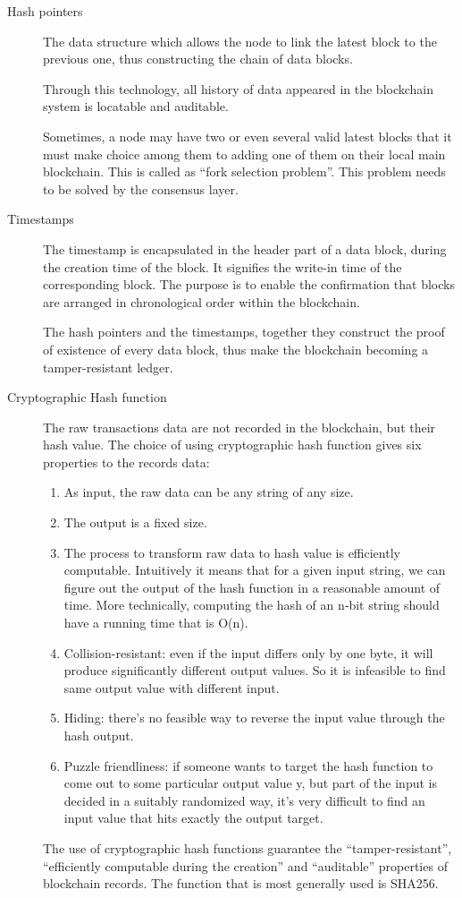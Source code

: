 \documentclass[doublespacing]{bmcart}
\begin{document}
\begin{CJK*}{UTF8}{gbsn}
\begin{description}
\item[Hash pointers] 
 
The data structure which allows the node to link the latest block to the previous one, thus constructing the chain of data blocks.
 
Through this technology, all history of data appeared in the blockchain system is locatable and auditable.
 
Sometimes, a node may have two or even several valid latest blocks that it must make choice among them to adding one of them on their local main blockchain. This is called as ``fork selection problem''. This problem needs to be solved by the consensus layer.

\item[Timestamps] 

The timestamp is encapsulated in the header part of a data block, during the creation time of the block. It signifies the write-in time of the corresponding block. The purpose is to enable the confirmation that blocks are arranged in chronological order within the blockchain.
 
The hash pointers and the timestamps, together they construct the proof of existence of every data block, thus make the blockchain becoming a tamper-resistant ledger. 
 
\item[Cryptographic Hash function] 
 
The raw transactions data are not recorded in the blockchain, but their hash value. The choice of using cryptographic hash function gives six properties to the records data:
\begin{enumerate}[1)]
\item  As input, the raw data can be any string of any size.
\item The output is a fixed size.
\item The process to transform raw data to hash value is efficiently computable. Intuitively it means that for a given input string, we can figure out the output of the hash function in a reasonable amount of time. More technically, computing the hash of an n‐bit string should have a running time that is O(n).
\item  Collision-resistant: even if the input differs only by one byte, it will produce significantly different output values. So it is infeasible to find same output value with different input.
\item Hiding: there's no  feasible way to reverse the input value through the hash output.
\item Puzzle friendliness: if someone wants to target the hash function to come out to some particular output value y, but part of the input is decided in a suitably randomized way,
it’s very difficult to find an input  value that hits exactly the output target.
\end{enumerate}
 The use of cryptographic hash functions guarantee the ``tamper-resistant'', ``efficiently computable during the creation'' and ``auditable'' properties of blockchain records. The function that is most generally used is SHA256.
 

\end{description}
\end{CJK*}
\end{document}
